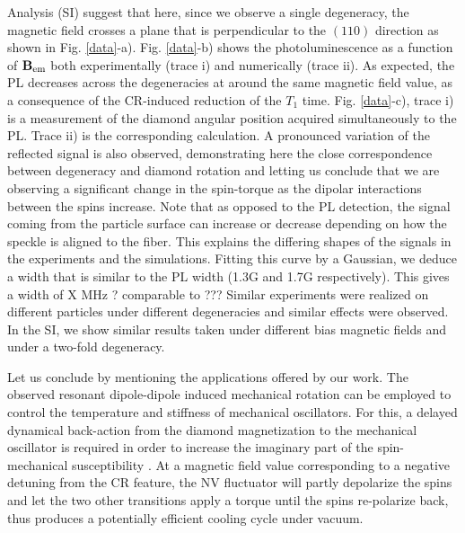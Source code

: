 \documentclass[preprintnumbers,amsmath,amssymb,superscriptaddress,twocolumn,showpacs]{revtex4-1}
\begin{document}
Analysis (SI) suggest that here, since we observe a single degeneracy, the magnetic field crosses a plane that is perpendicular to the $(110)$ direction as shown in Fig. \ref{data}-a).
Fig. \ref{data}-b) shows the photoluminescence as a function of $\bf B_{\rm em}$ both experimentally (trace i) and numerically (trace ii).
As expected, the PL decreases across the degeneracies at around the same magnetic field value, as a consequence of the CR-induced reduction of the $T_1$ time.
Fig. \ref{data}-c), trace i) is a measurement of the diamond angular position acquired simultaneously to the PL. Trace ii) is the corresponding calculation.   
A pronounced variation of the reflected signal is also observed, demonstrating here the close correspondence between degeneracy and diamond rotation and letting us conclude that we are observing a significant change in the spin-torque as the dipolar interactions between the spins increase. Note that as opposed to the PL detection, the signal coming from the particle surface can increase or decrease depending on how the speckle is aligned to the fiber. This explains the differing shapes of the signals in the experiments and the simulations. 
Fitting this curve by a Gaussian, we deduce a width that is similar to the PL width (1.3G and 1.7G respectively). This gives a width of X MHz ? comparable to ???
Similar experiments were realized on different particles under different degeneracies and similar effects were observed.
In the SI, we show similar results taken under different bias magnetic fields and under a two-fold degeneracy. 

Let us conclude by mentioning the applications offered by our work. 
The observed resonant dipole-dipole induced mechanical rotation can be employed to control the temperature and stiffness of mechanical oscillators. 
For this, a delayed dynamical back-action from the diamond magnetization to the mechanical oscillator is required \cite{Aspelmeyer} in order to increase the imaginary part of the spin-mechanical susceptibility \cite{DelordNat}.
At a magnetic field value corresponding to a negative detuning from the CR feature, the NV fluctuator will partly depolarize the spins and let the two other transitions apply a torque until the spins re-polarize back, thus produces a potentially efficient cooling cycle under vacuum.  %
\end{document}
